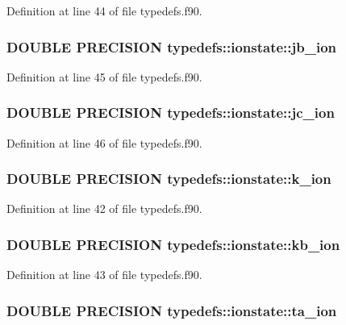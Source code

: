 Definition at line 44 of file typedefs.f90.\hypertarget{typetypedefs_1_1ionstate_ab6e13b95075b80113c61664876a1ee9b}{
\subsubsection[{jb\_\-ion}]{\setlength{\rightskip}{0pt plus 5cm}DOUBLE PRECISION {\bf typedefs::ionstate::jb\_\-ion}}}
\label{typetypedefs_1_1ionstate_ab6e13b95075b80113c61664876a1ee9b}


Definition at line 45 of file typedefs.f90.\hypertarget{typetypedefs_1_1ionstate_a196abd455c2794532924827147606727}{
\subsubsection[{jc\_\-ion}]{\setlength{\rightskip}{0pt plus 5cm}DOUBLE PRECISION {\bf typedefs::ionstate::jc\_\-ion}}}
\label{typetypedefs_1_1ionstate_a196abd455c2794532924827147606727}


Definition at line 46 of file typedefs.f90.\hypertarget{typetypedefs_1_1ionstate_ab3ae6aade6de9efb14a7800bf0fa775a}{
\subsubsection[{k\_\-ion}]{\setlength{\rightskip}{0pt plus 5cm}DOUBLE PRECISION {\bf typedefs::ionstate::k\_\-ion}}}
\label{typetypedefs_1_1ionstate_ab3ae6aade6de9efb14a7800bf0fa775a}


Definition at line 42 of file typedefs.f90.\hypertarget{typetypedefs_1_1ionstate_a9d7ea35f24152b9746a0ed12ac371811}{
\subsubsection[{kb\_\-ion}]{\setlength{\rightskip}{0pt plus 5cm}DOUBLE PRECISION {\bf typedefs::ionstate::kb\_\-ion}}}
\label{typetypedefs_1_1ionstate_a9d7ea35f24152b9746a0ed12ac371811}


Definition at line 43 of file typedefs.f90.\hypertarget{typetypedefs_1_1ionstate_a9e2f209a3ad264f417b44935a275e55b}{
\subsubsection[{ta\_\-ion}]{\setlength{\rightskip}{0pt plus 5cm}DOUBLE PRECISION {\bf typedefs::ionstate::ta\_\-ion}}}
\label{typetypedefs_1_1ionstate_a9e2f209a3ad264f417b44935a275e55b}


